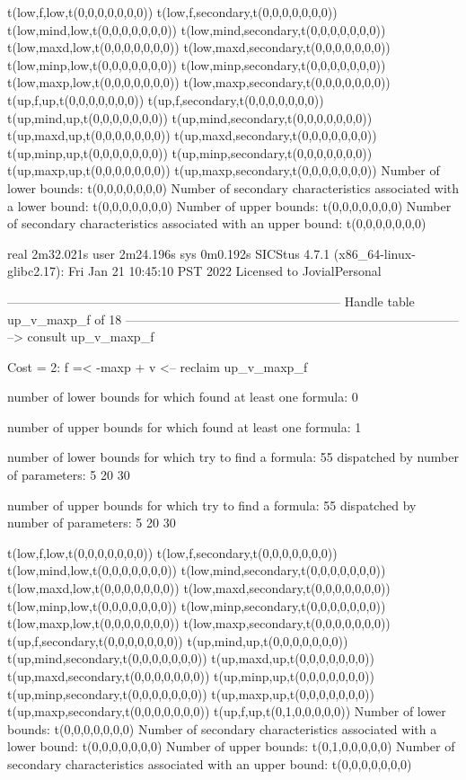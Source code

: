 t(low,f,low,t(0,0,0,0,0,0,0))
t(low,f,secondary,t(0,0,0,0,0,0,0))
t(low,mind,low,t(0,0,0,0,0,0,0))
t(low,mind,secondary,t(0,0,0,0,0,0,0))
t(low,maxd,low,t(0,0,0,0,0,0,0))
t(low,maxd,secondary,t(0,0,0,0,0,0,0))
t(low,minp,low,t(0,0,0,0,0,0,0))
t(low,minp,secondary,t(0,0,0,0,0,0,0))
t(low,maxp,low,t(0,0,0,0,0,0,0))
t(low,maxp,secondary,t(0,0,0,0,0,0,0))
t(up,f,up,t(0,0,0,0,0,0,0))
t(up,f,secondary,t(0,0,0,0,0,0,0))
t(up,mind,up,t(0,0,0,0,0,0,0))
t(up,mind,secondary,t(0,0,0,0,0,0,0))
t(up,maxd,up,t(0,0,0,0,0,0,0))
t(up,maxd,secondary,t(0,0,0,0,0,0,0))
t(up,minp,up,t(0,0,0,0,0,0,0))
t(up,minp,secondary,t(0,0,0,0,0,0,0))
t(up,maxp,up,t(0,0,0,0,0,0,0))
t(up,maxp,secondary,t(0,0,0,0,0,0,0))
Number of lower bounds:                                             t(0,0,0,0,0,0,0)
Number of secondary characteristics associated with a lower bound:  t(0,0,0,0,0,0,0)
Number of upper bounds:                                             t(0,0,0,0,0,0,0)
Number of secondary characteristics associated with an upper bound: t(0,0,0,0,0,0,0)

real	2m32.021s
user	2m24.196s
sys	0m0.192s
SICStus 4.7.1 (x86_64-linux-glibc2.17): Fri Jan 21 10:45:10 PST 2022
Licensed to JovialPersonal


--------------------------------------------------------------------------------
Handle table up_v_maxp_f of 18
--------------------------------------------------------------------------------
--> consult up_v_maxp_f

Cost =  2:  f =< -maxp + v
<-- reclaim up_v_maxp_f

number of lower bounds for which found at least one formula: 0

number of upper bounds for which found at least one formula: 1

number of lower bounds for which try to find a formula: 55
dispatched by number of parameters: 5  20  30

number of upper bounds for which try to find a formula: 55
dispatched by number of parameters: 5  20  30

t(low,f,low,t(0,0,0,0,0,0,0))
t(low,f,secondary,t(0,0,0,0,0,0,0))
t(low,mind,low,t(0,0,0,0,0,0,0))
t(low,mind,secondary,t(0,0,0,0,0,0,0))
t(low,maxd,low,t(0,0,0,0,0,0,0))
t(low,maxd,secondary,t(0,0,0,0,0,0,0))
t(low,minp,low,t(0,0,0,0,0,0,0))
t(low,minp,secondary,t(0,0,0,0,0,0,0))
t(low,maxp,low,t(0,0,0,0,0,0,0))
t(low,maxp,secondary,t(0,0,0,0,0,0,0))
t(up,f,secondary,t(0,0,0,0,0,0,0))
t(up,mind,up,t(0,0,0,0,0,0,0))
t(up,mind,secondary,t(0,0,0,0,0,0,0))
t(up,maxd,up,t(0,0,0,0,0,0,0))
t(up,maxd,secondary,t(0,0,0,0,0,0,0))
t(up,minp,up,t(0,0,0,0,0,0,0))
t(up,minp,secondary,t(0,0,0,0,0,0,0))
t(up,maxp,up,t(0,0,0,0,0,0,0))
t(up,maxp,secondary,t(0,0,0,0,0,0,0))
t(up,f,up,t(0,1,0,0,0,0,0))
Number of lower bounds:                                             t(0,0,0,0,0,0,0)
Number of secondary characteristics associated with a lower bound:  t(0,0,0,0,0,0,0)
Number of upper bounds:                                             t(0,1,0,0,0,0,0)
Number of secondary characteristics associated with an upper bound: t(0,0,0,0,0,0,0)

